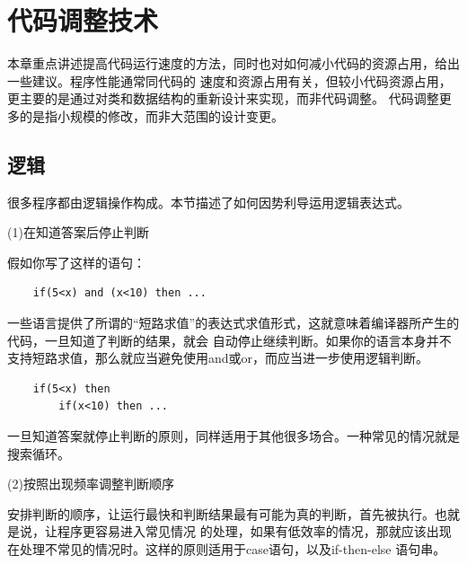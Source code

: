 \documentclass{article}
\begin{document}
\section{代码调整技术}
本章重点讲述提高代码运行速度的方法，同时也对如何减小代码的资源占用，给出一些建议。程序性能通常同代码的
速度和资源占用有关，但较小代码资源占用，更主要的是通过对类和数据结构的重新设计来实现，而非代码调整。
代码调整更多的是指小规模的修改，而非大范围的设计变更。
\subsection{逻辑}
很多程序都由逻辑操作构成。本节描述了如何因势利导运用逻辑表达式。
\par
(1)在知道答案后停止判断
\par
假如你写了这样的语句：
\begin{lstlisting}
    if(5<x) and (x<10) then ...
\end{lstlisting}
一些语言提供了所谓的“短路求值”的表达式求值形式，这就意味着编译器所产生的代码，一旦知道了判断的结果，就会
自动停止继续判断。如果你的语言本身并不支持短路求值，那么就应当避免使用and或or，而应当进一步使用逻辑判断。
\begin{lstlisting}
    if(5<x) then
        if(x<10) then ...
\end{lstlisting}
一旦知道答案就停止判断的原则，同样适用于其他很多场合。一种常见的情况就是搜索循环。

\par
(2)按照出现频率调整判断顺序
\par
安排判断的顺序，让运行最快和判断结果最有可能为真的判断，首先被执行。也就是说，让程序更容易进入常见情况
的处理，如果有低效率的情况，那就应该出现在处理不常见的情况时。这样的原则适用于case语句，以及if-then-else
语句串。
\end{document}
